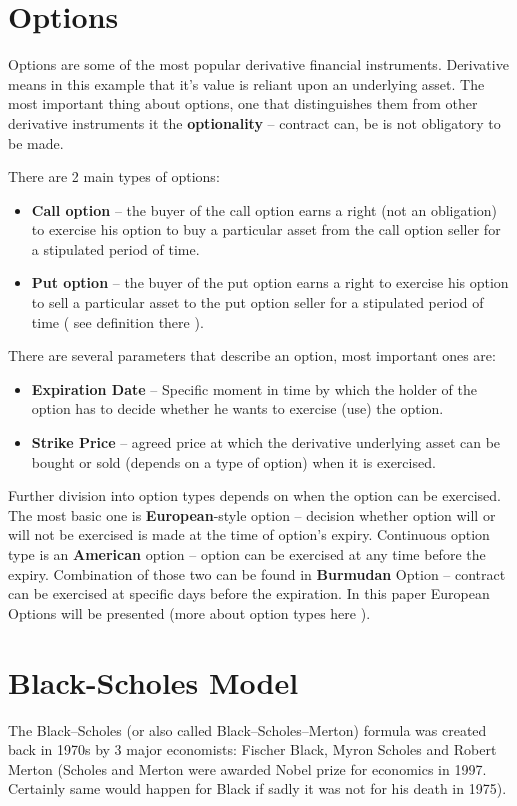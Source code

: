 \section{Options}
    Options are some of the most popular derivative financial instruments. Derivative means in this example that it's value is reliant upon an underlying asset. The most important thing about options, one that distinguishes them from other derivative instruments it the \textbf{optionality} -- contract can, be is not obligatory to be made.
    
    There are 2 main types of options:
    \begin{itemize}
        \item \textbf{Call option} -- the buyer of the call option earns a right (not an obligation) to exercise his option to buy a particular asset from the call option seller for a stipulated period of time.
        \item \textbf{Put option} -- the buyer of the put option earns a right to exercise his option to sell a particular asset to the put option seller for a stipulated period of time ( see definition there \cite{Call_Put_Option_Definition}).
    \end{itemize}
    
    There are several parameters that describe an option, most important ones are:
    \begin{itemize}
        \item \textbf{Expiration Date} -- Specific moment in time by which the holder of the option has to decide whether he wants to exercise (use) the option.
        \item \textbf{Strike Price} -- agreed price at which the derivative underlying asset can be bought or sold (depends on a type of option) when it is exercised.
    \end{itemize}
    
    Further division into option types depends on when the option can be exercised. The most basic one is \textbf{European}-style option -- decision whether option will or will not be exercised is made at the time of option's expiry. Continuous option type is an \textbf{American} option -- option can be exercised at any time before the expiry. Combination of those two can be found in \textbf{Burmudan} Option -- contract can be exercised at specific days before the expiration. In this paper European Options will be presented (more about option types here \cite{Option_Types}).

\section{Black-Scholes Model}
    The Black--Scholes (or also called Black--Scholes--Merton) formula was created back in 1970s by 3 major economists: Fischer Black, Myron Scholes and Robert Merton (Scholes and Merton were awarded Nobel prize for economics in 1997. Certainly same would happen for Black if sadly it was not for his death in 1975).
    
